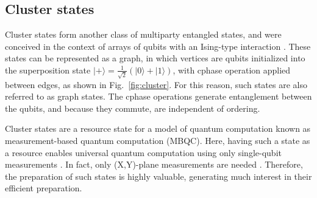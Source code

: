 \documentclass[times,final]{elsarticle}
\newcommand{\ket}[1]{|#1\rangle}
\begin{document}
\subsection{Cluster states}\label{section:cluster}

Cluster states form another class of multiparty entangled states, and were conceived in the context of arrays of qubits with an Ising-type interaction \cite{bib:Briegel01}. These states can be represented as a graph, in which vertices are qubits initialized into the superposition state $\ket{+}=\frac{1}{\sqrt{2}}(\ket{0}+\ket{1})$, with {\sc cphase} operation applied between edges, as shown in Fig.~\ref{fig:cluster}. For this reason, such states are also referred to as graph states. The {\sc cphase} operations generate entanglement between the qubits, and because they commute, are independent of ordering.

Cluster states are a resource state for a model of quantum computation known as measurement-based quantum computation (MBQC). Here, having such a state as a resource enables universal quantum computation using only single-qubit measurements \cite{bib:Raussendorf03}. In fact, only (X,Y)-plane measurements are needed \cite{bib:Mantri17}. Therefore, the preparation of such states is highly valuable, generating much interest in their efficient preparation.
\end{document}
